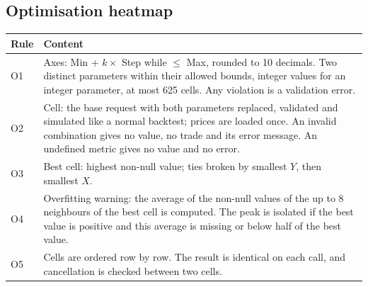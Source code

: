 \documentclass[11pt,a4paper]{article}
\begin{document}
\subsection*{Optimisation heatmap}
\begin{longtable}{@{}p{0.9cm}p{14.8cm}@{}}
\toprule
\textbf{Rule} & \textbf{Content} \\
\midrule
\endhead
O1 & Axes: Min + $k \times$ Step while $\leq$ Max, rounded to 10 decimals. Two distinct parameters within their allowed bounds, integer values for an integer parameter, at most 625 cells. Any violation is a validation error. \\
O2 & Cell: the base request with both parameters replaced, validated and simulated like a normal backtest; prices are loaded once. An invalid combination gives no value, no trade and its error message. An undefined metric gives no value and no error. \\
O3 & Best cell: highest non-null value; ties broken by smallest $Y$, then smallest $X$. \\
O4 & Overfitting warning: the average of the non-null values of the up to 8 neighbours of the best cell is computed. The peak is isolated if the best value is positive and this average is missing or below half of the best value. \\
O5 & Cells are ordered row by row. The result is identical on each call, and cancellation is checked between two cells. \\
\bottomrule
\end{longtable}
\end{document}
